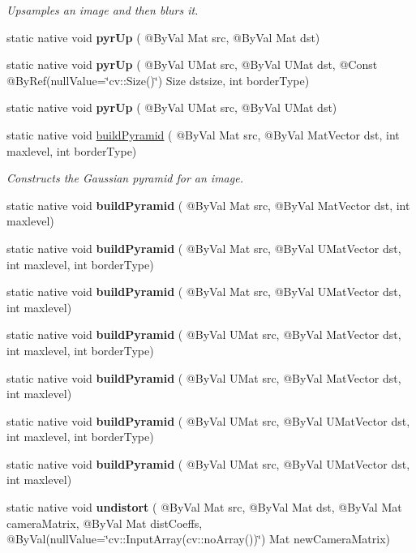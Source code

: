 \begin{DoxyCompactItemize}
\begin{DoxyCompactList}\small\item\em Upsamples an image and then blurs it. \end{DoxyCompactList}\item 
static native void {\bfseries pyr\+Up} ( @By\+Val Mat src, @By\+Val Mat dst)
\item 
static native void {\bfseries pyr\+Up} ( @By\+Val U\+Mat src, @By\+Val U\+Mat dst, @Const @By\+Ref(null\+Value=\char`\"{}cv\+::\+Size()\char`\"{}) Size dstsize, int border\+Type)
\item 
static native void {\bfseries pyr\+Up} ( @By\+Val U\+Mat src, @By\+Val U\+Mat dst)
\item 
static native void \hyperlink{group__imgproc__filter_ga418b215211fecb0c256c9db02d80dd0e}{build\+Pyramid} ( @By\+Val Mat src, @By\+Val Mat\+Vector dst, int maxlevel, int border\+Type)
\begin{DoxyCompactList}\small\item\em Constructs the Gaussian pyramid for an image. \end{DoxyCompactList}\item 
static native void {\bfseries build\+Pyramid} ( @By\+Val Mat src, @By\+Val Mat\+Vector dst, int maxlevel)
\item 
static native void {\bfseries build\+Pyramid} ( @By\+Val Mat src, @By\+Val U\+Mat\+Vector dst, int maxlevel, int border\+Type)
\item 
static native void {\bfseries build\+Pyramid} ( @By\+Val Mat src, @By\+Val U\+Mat\+Vector dst, int maxlevel)
\item 
static native void {\bfseries build\+Pyramid} ( @By\+Val U\+Mat src, @By\+Val Mat\+Vector dst, int maxlevel, int border\+Type)
\item 
static native void {\bfseries build\+Pyramid} ( @By\+Val U\+Mat src, @By\+Val Mat\+Vector dst, int maxlevel)
\item 
static native void {\bfseries build\+Pyramid} ( @By\+Val U\+Mat src, @By\+Val U\+Mat\+Vector dst, int maxlevel, int border\+Type)
\item 
static native void {\bfseries build\+Pyramid} ( @By\+Val U\+Mat src, @By\+Val U\+Mat\+Vector dst, int maxlevel)
\item 
static native void {\bfseries undistort} ( @By\+Val Mat src, @By\+Val Mat dst, @By\+Val Mat camera\+Matrix, @By\+Val Mat dist\+Coeffs, @By\+Val(null\+Value=\char`\"{}cv\+::\+Input\+Array(cv\+::no\+Array())\char`\"{}) Mat new\+Camera\+Matrix)
\item 

\end{DoxyCompactItemize}
